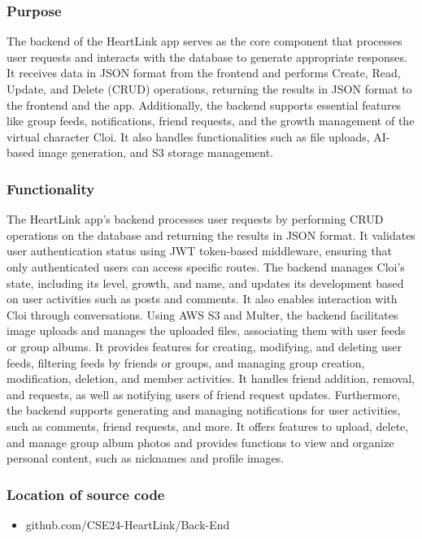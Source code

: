         \subsubsection{Purpose} 
            The backend of the HeartLink app serves as the core component that processes user requests and interacts with the database to generate appropriate responses. It receives data in JSON format from the frontend and performs Create, Read, Update, and Delete (CRUD) operations, returning the results in JSON format to the frontend and the app.
            Additionally, the backend supports essential features like group feeds, notifications, friend requests, and the growth management of the virtual character Cloi. It also handles functionalities such as file uploads, AI-based image generation, and S3 storage management.\\
            \vspace{3mm}
        \subsubsection{Functionality}
            The HeartLink app's backend processes user requests by performing CRUD operations on the database and returning the results in JSON format. It validates user authentication status using JWT token-based middleware, ensuring that only authenticated users can access specific routes. The backend manages Cloi’s state, including its level, growth, and name, and updates its development based on user activities such as posts and comments. It also enables interaction with Cloi through conversations.
            Using AWS S3 and Multer, the backend facilitates image uploads and manages the uploaded files, associating them with user feeds or group albums. It provides features for creating, modifying, and deleting user feeds, filtering feeds by friends or groups, and managing group creation, modification, deletion, and member activities. It handles friend addition, removal, and requests, as well as notifying users of friend request updates.
            Furthermore, the backend supports generating and managing notifications for user activities, such as comments, friend requests, and more. It offers features to upload, delete, and manage group album photos and provides functions to view and organize personal content, such as nicknames and profile images.\\
            \vspace{3mm}
        \subsubsection{Location of source code}
            \begin{itemize}
                \item github.com/CSE24-HeartLink/Back-End
            \end{itemize}

